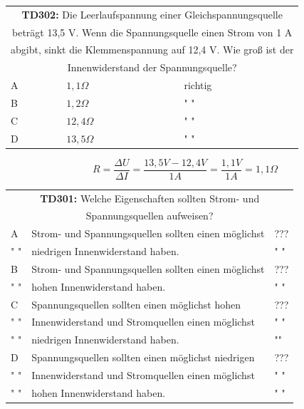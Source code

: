\begin{frame}
	\begin{small}	
	\begin{tabular}{|l|l|l|}
	\hline
		\multicolumn{3}{|c|}{\textbf{TD302:} Die Leerlaufspannung einer Gleichspannungsquelle}\\
		\multicolumn{3}{|c|}{beträgt 13,5 V. Wenn die Spannungsquelle einen Strom von 1 A}\\
		\multicolumn{3}{|c|}{abgibt, sinkt die Klemmenspannung auf 12,4 V. Wie groß ist der}\\			\multicolumn{3}{|c|}{Innenwiderstand der Spannungsquelle?}\\
		\hline
		A & $1,1 \Omega$ & richtig \\ \hline
		B & $1,2 \Omega$ & " "\\ \hline
		C & $12,4 \Omega$ & " "\\ \hline
		D & $13,5 \Omega$ & " " \\ \hline 		
	\end{tabular}
	\end{small}
	\vspace{1cm}
	\begin{equation}
		R = \frac{\Delta U}{\Delta I} = \frac{13,5V - 12,4V}{1A} = \frac{1,1V}{1A} = 1,1\Omega
	\end{equation}
\end{frame}

\begin{frame}
	\begin{small}	
	\begin{tabular}{|l|l|l|}
	\hline
		\multicolumn{3}{|c|}{\textbf{TD301:} Welche Eigenschaften sollten Strom- und}\\
		\multicolumn{3}{|c|}{Spannungsquellen aufweisen?}\\
		\hline
		A &  Strom- und Spannungsquellen sollten einen möglichst  & ??? \\
		" " & niedrigen Innenwiderstand haben. & " "\\ \hline
		B &  Strom- und Spannungsquellen sollten einen möglichst  & ??? \\
		" " & hohen Innenwiderstand haben. & " "\\ \hline
		C & Spannungsquellen sollten einen möglichst hohen & ??? \\
		" " & Innenwiderstand und Stromquellen einen möglichst  & " " \\ 
		" " & niedrigen Innenwiderstand haben.  & "" \\ \hline
		D & Spannungsquellen sollten einen möglichst niedrigen & ??? \\
		" " & Innenwiderstand und Stromquellen einen möglichst & " " \\ 
		" " & hohen Innenwiderstand haben.  & " " \\ \hline 		
	\end{tabular}
	\end{small}
\end{frame}

